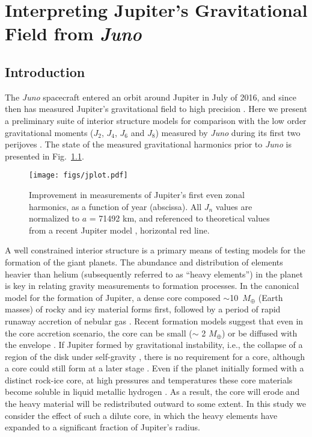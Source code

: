 \chapter{Interpreting Jupiter's Gravitational Field from \textit{Juno}}\label{chap8}

\section{Introduction} \label{sec:intro}

The \textit{Juno} spacecraft entered an orbit around Jupiter in July of 2016, and
since then has measured Jupiter's gravitational field to high precision
\citep{bolton2017}.  Here we present a preliminary suite of interior structure models
for comparison with the low order gravitational moments ($J_2$, $J_4$, $J_6$ and
$J_8$) measured by \textit{Juno} during its first two perijoves \citep{Folkner2017}.
The state of the measured gravitational harmonics prior to \textit{Juno} is presented
in Fig.~\ref{fig:jplot}.

\begin{figure}[h]
  \begin{center}
    \noindent\texttt{[image: figs/jplot.pdf]}
  \end{center}
\caption{Improvement in measurements of Jupiter's first even zonal harmonics, as a function of year
(abscissa).  All $J_n$ values are normalized to $a$ = 71492 km, and referenced to theoretical
values from a recent Jupiter model \citep{hubbard2016}, horizontal red line. }
\label{fig:jplot}
\end{figure}

A well constrained interior structure is  a primary means of testing models for
the formation of the giant planets. The abundance and distribution of elements
heavier than helium  (subsequently referred to as ``heavy elements'') in the
planet is key in relating gravity measurements to formation processes. In the
canonical model for the formation of Jupiter, a dense core composed
$\sim$10~$M_\oplus$ (Earth masses) of rocky and icy material forms first,
followed by a period of rapid runaway accretion of nebular gas
\citep{Mizuno1978,Bodenheimer1986,Pollack1996}. Recent formation models suggest
that even in the core accretion scenario, the core can be small ($\sim$ 2
$M_\oplus$) or be diffused with the envelope
\citep{venturini2016,lozovsky2017}. If Jupiter formed by gravitational
instability, i.e., the collapse of a region of the disk under self-gravity
\citep{Boss1997}, there is no requirement for a core, although a core could
still form at a later stage \citep{helled2014}.  Even if the planet initially
formed with a distinct rock-ice core, at high pressures and temperatures these
core materials become soluble in liquid metallic hydrogen
\citep{Stevenson1985,Wilson2012a,wilson12b,Wahl2013,Gonzalez2013}. As a
result, the core will erode and the heavy material will be redistributed
outward to some extent. In this study we consider the effect of such a dilute
core, in which the heavy elements have expanded to a significant fraction of
Jupiter's radius.



